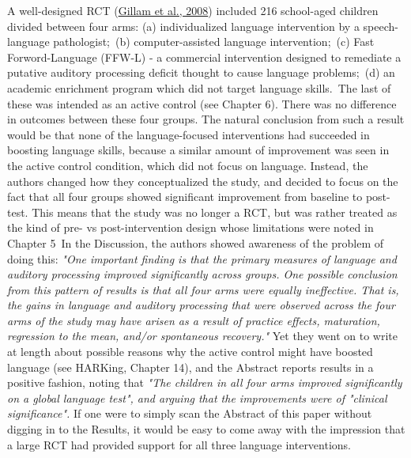 \documentclass{krantz}
\begin{document}
\begin{tcolorbox}[colback=Black!5!lightgray,colframe=black!75!black,coltitle=white,title=An example of spin in evaluating speech and language therapy]\label{box:spineg}
A well-designed RCT (\protect\hyperlink{ref-gillam2008}{Gillam et al., 2008}) included 216 school-aged children divided between four arms:  
(a) individualized language intervention by a speech-language pathologist;\
(b) computer-assisted language intervention;\
(c) Fast Forword-Language (FFW-L) - a commercial intervention designed to remediate a putative auditory processing deficit thought to cause language problems;\
(d) an academic enrichment program which did not target language skills.\
The last of these was intended as an active control (see Chapter 6). There was no difference in outcomes between these four groups. The natural conclusion from such a result would be that none of the language-focused interventions had succeeded in boosting language skills, because a similar amount of improvement was seen in the active control condition, which did not focus on language. Instead, the authors changed how they conceptualized the study, and decided to focus on the fact that all four groups showed significant improvement from baseline to post-test. This means that the study was no longer a RCT, but was rather treated as the kind of pre- vs post-intervention design whose limitations were noted in Chapter 5\
In the Discussion, the authors showed awareness of the problem of doing this: \textit{"One important finding is that the primary measures of language and auditory processing improved significantly across groups. One possible conclusion from this pattern of results is that all four arms were equally ineffective. That is, the gains in language and auditory processing that were observed across the four arms of the study may have arisen as a result of practice effects, maturation, regression to the mean, and/or spontaneous recovery."} Yet they went on to write at length about possible reasons why the active control might have boosted language (see HARKing, Chapter 14), and the Abstract reports results in a positive fashion, noting that \textit{"The children in all four arms improved significantly on a global language test", and arguing that the improvements were of "clinical significance".} If one were to simply scan the Abstract of this paper without digging in to the Results, it would be easy to come away with the impression that a large RCT had provided support for all three language interventions.
\end{tcolorbox}
\end{document}
